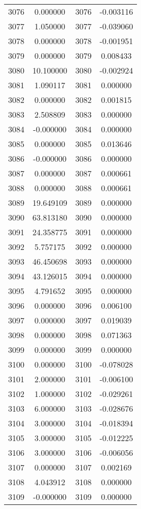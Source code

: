 \documentclass[12pt]{article}
\begin{document}
\begin{longtable}{@{}cccc@{}}
3076 & 0.000000 & 3076 & -0.003116 \\
3077 & 1.050000 & 3077 & -0.039060 \\
3078 & 0.000000 & 3078 & -0.001951 \\
3079 & 0.000000 & 3079 & 0.008433 \\
3080 & 10.100000 & 3080 & -0.002924 \\
3081 & 1.090117 & 3081 & 0.000000 \\
3082 & 0.000000 & 3082 & 0.001815 \\
3083 & 2.508809 & 3083 & 0.000000 \\
3084 & -0.000000 & 3084 & 0.000000 \\
3085 & 0.000000 & 3085 & 0.013646 \\
3086 & -0.000000 & 3086 & 0.000000 \\
3087 & 0.000000 & 3087 & 0.000661 \\
3088 & 0.000000 & 3088 & 0.000661 \\
3089 & 19.649109 & 3089 & 0.000000 \\
3090 & 63.813180 & 3090 & 0.000000 \\
3091 & 24.358775 & 3091 & 0.000000 \\
3092 & 5.757175 & 3092 & 0.000000 \\
3093 & 46.450698 & 3093 & 0.000000 \\
3094 & 43.126015 & 3094 & 0.000000 \\
3095 & 4.791652 & 3095 & 0.000000 \\
3096 & 0.000000 & 3096 & 0.006100 \\
3097 & 0.000000 & 3097 & 0.019039 \\
3098 & 0.000000 & 3098 & 0.071363 \\
3099 & 0.000000 & 3099 & 0.000000 \\
3100 & 0.000000 & 3100 & -0.078028 \\
3101 & 2.000000 & 3101 & -0.006100 \\
3102 & 1.000000 & 3102 & -0.029261 \\
3103 & 6.000000 & 3103 & -0.028676 \\
3104 & 3.000000 & 3104 & -0.018394 \\
3105 & 3.000000 & 3105 & -0.012225 \\
3106 & 3.000000 & 3106 & -0.006056 \\
3107 & 0.000000 & 3107 & 0.002169 \\
3108 & 4.043912 & 3108 & 0.000000 \\
3109 & -0.000000 & 3109 & 0.000000 \\

\end{longtable}
\end{document}
